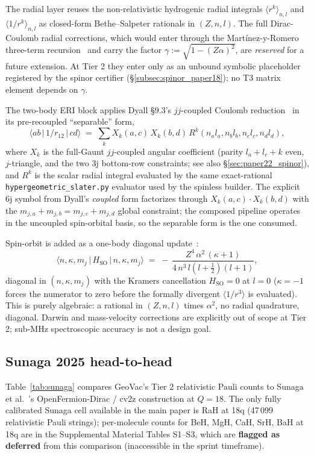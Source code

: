 The radial layer reuses the non-relativistic hydrogenic radial
integrals $\langle r^k \rangle_{n,l}$ and $\langle 1/r^k \rangle_{n,l}$
as closed-form Bethe--Salpeter rationals in $(Z, n, l)$. The full
Dirac-Coulomb radial corrections, which would enter through the
Martínez-y-Romero three-term recursion~\cite{MartinezYRomero2004} and
carry the factor $\gamma := \sqrt{1 - (Z\alpha)^2}$, are \emph{reserved}
for a future extension. At Tier 2 they enter only as an unbound
symbolic placeholder registered by the spinor certifier
(\S\ref{subsec:spinor_paper18}); no T3 matrix element depends on $\gamma$.

The two-body ERI block applies Dyall \S 9.3's $jj$-coupled Coulomb
reduction~\cite{Dyall} in its pre-recoupled ``separable'' form,
\[
  \langle a b \,|\, 1/r_{12} \,|\, c d \rangle
  \;=\; \sum_k X_k(a, c)\, X_k(b, d)\, R^k(n_a l_a, n_b l_b, n_c l_c, n_d l_d),
\]
where $X_k$ is the full-Gaunt $jj$-coupled angular coefficient
(parity $l_a + l_c + k$ even, $j$-triangle, and the two 3j bottom-row
constraints; see also \S\ref{sec:paper22_spinor}), and $R^k$ is the
scalar radial integral evaluated by the same exact-rational
\texttt{hypergeometric\_slater.py} evaluator used by the spinless
builder. The explicit 6j symbol from Dyall's \emph{coupled} form
factorizes through $X_k(a,c) \cdot X_k(b,d)$ with the
$m_{j,a} + m_{j,b} = m_{j,c} + m_{j,d}$ global constraint; the
composed pipeline operates in the uncoupled spin-orbital basis, so
the separable form is the one consumed.

Spin-orbit is added as a one-body diagonal update~\cite{BreitPauli}:
\[
  \langle n, \kappa, m_j \,|\, H_{\mathrm{SO}} \,|\, n, \kappa, m_j \rangle
  \;=\; -\,\frac{Z^4\,\alpha^2\,(\kappa+1)}{4\,n^3\, l(l+\tfrac{1}{2})(l+1)},
\]
diagonal in $(n, \kappa, m_j)$ with the Kramers cancellation
$H_{\mathrm{SO}} = 0$ at $l = 0$ ($\kappa = -1$ forces the numerator
to zero before the formally divergent $\langle 1/r^3\rangle$ is
evaluated). This is purely algebraic: a rational in $(Z, n, l)$
times $\alpha^2$, no radial quadrature, diagonal. Darwin and
mass-velocity corrections are explicitly out of scope at Tier 2;
sub-MHz spectroscopic accuracy is not a design goal.

\subsection{Sunaga 2025 head-to-head}
\label{subsec:sunaga}

Table~\ref{tab:sunaga} compares GeoVac's Tier 2 relativistic Pauli
counts to Sunaga et al.~\cite{Sunaga2025}'s
OpenFermion-Dirac / cv2z construction at $Q = 18$. The only fully
calibrated Sunaga cell available in the main paper is RaH at 18q
(47\,099 relativistic Pauli strings); per-molecule counts for BeH,
MgH, CaH, SrH, BaH at 18q are in the Supplemental Material Tables
S1--S3, which are \textbf{flagged as deferred} from this comparison
(inaccessible in the sprint timeframe).

